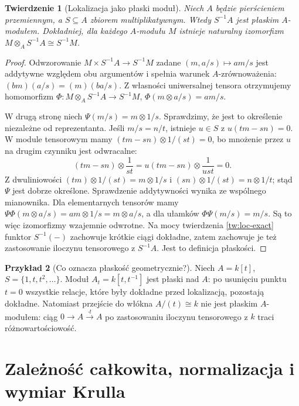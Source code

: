 \documentclass[11pt,a4paper,openany]{report}
\numberwithin{equation}{section}
\theoremstyle{plain}
\newtheorem{twierdzenie}{Twierdzenie}[section]
\theoremstyle{definition}
\newtheorem{przyklad}[twierdzenie]{Przykład}
\theoremstyle{remark}
\begin{document}
\begin{twierdzenie}[Lokalizacja jako płaski moduł]
\label{tw:lokalizacja-plaska}
Niech $A$ będzie pierścieniem przemiennym, a $S\subseteq A$
zbiorem multiplikatywnym. Wtedy $S^{-1}A$ jest płaskim
$A$-modułem. Dokładniej, dla każdego $A$-modułu $M$
istnieje naturalny izomorfizm
$M\otimes_A S^{-1}A\cong S^{-1}M$.
\end{twierdzenie}
\begin{proof}
Odwzorowanie $M\times S^{-1}A\to S^{-1}M$ zadane
$(m,a/s)\mapsto am/s$ jest addytywne względem obu
argumentów i spełnia warunek $A$-zrównoważenia:
$(bm)(a/s)=(m)(ba/s)$. Z własności uniwersalnej
tensora otrzymujemy homomorfizm
$\Phi:M\otimes_A S^{-1}A\to S^{-1}M$,
$\Phi(m\otimes a/s)=am/s$.

W drugą stronę niech $\Psi(m/s)=m\otimes 1/s$.
Sprawdzimy, że jest to określenie niezależne od
reprezentanta. Jeśli $m/s=n/t$, istnieje $u\in S$
z $u(tm-sn)=0$. W module tensorowym mamy
$(tm-sn)\otimes 1/(st)=0$, bo mnożenie przez
$u$ na drugim czynniku jest odwracalne:
\[
 (tm-sn)\otimes\frac1{st}
 =u(tm-sn)\otimes\frac1{ust}=0.
\]
Z dwuliniowości
$(tm)\otimes 1/(st)=m\otimes 1/s$ i
$(sn)\otimes 1/(st)=n\otimes 1/t$;
stąd $\Psi$ jest dobrze określone. Sprawdzenie
addytywności wynika ze wspólnego mianownika.
Dla elementarnych tensorów mamy
$\Psi\Phi(m\otimes a/s)=am\otimes1/s
=m\otimes a/s$, a dla ułamków
$\Phi\Psi(m/s)=m/s$. Są to więc izomorfizmy
wzajemnie odwrotne. Na mocy twierdzenia
\ref{tw:loc-exact} funktor $S^{-1}(-)$ zachowuje
krótkie ciągi dokładne, zatem zachowuje je też
zastosowanie iloczynu tensorowego z $S^{-1}A$. Jest to definicja
płaskości.
\end{proof}

\begin{przyklad}[Co oznacza płaskość geometrycznie?]
Niech $A=k[t]$, $S=\{1,t,t^2,\ldots\}$.
Moduł $A_t=k[t,t^{-1}]$ jest płaski nad $A$:
po usunięciu punktu $t=0$ wszystkie relacje,
które były dokładne przed lokalizacją, pozostają
dokładne. Natomiast przejście do włókna
$A/(t)\cong k$ nie jest płaskim $A$-modułem:
ciąg $0\to A\xrightarrow{\cdot t}A$ po
zastosowaniu iloczynu tensorowego z $k$ traci różnowartościowość.
\end{przyklad}

\section{Zależność całkowita, normalizacja i wymiar Krulla}
\label{sec:integral}
\end{document}
